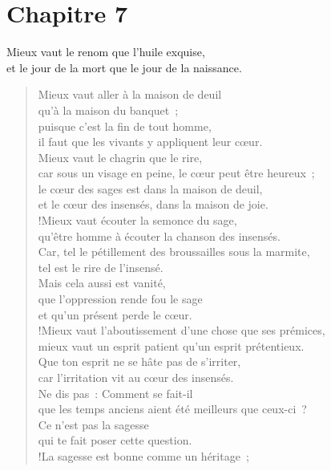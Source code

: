 \documentclass[french,twoside]{book} %
\def\mednobreak{\ifdim\lastskip<\medskipamount
  \removelastskip\nopagebreak\medskip\fi}
\newcommand{\labelblock}[1]{\medbreak{\noindent\color{rubric}\bfseries #1}\par\mednobreak}
\begin{document}
\section[Chapitre 7]{Chapitre 7}\renewcommand{\leftmark}{Chapitre 7}


\labelblock{Relativité des biens}

Mieux vaut le renom que l’huile exquise, \\
et le jour de la mort que le jour de la naissance.\\

\begin{verse}
Mieux vaut aller à la maison de deuil \\
qu’à la maison du banquet ; \\
puisque c’est la fin de tout homme, \\
il faut que les vivants y appliquent leur cœur.\\
Mieux vaut le chagrin que le rire, \\
car sous un visage en peine, le cœur peut être heureux ;\\
le cœur des sages est dans la maison de deuil, \\
et le cœur des insensés, dans la maison de joie.\\!Mieux vaut écouter la semonce du sage, \\
qu’être homme à écouter la chanson des insensés.\\
Car, tel le pétillement des broussailles sous la marmite, \\
tel est le rire de l’insensé. \\
Mais cela aussi est vanité,\\
que l’oppression rende fou le sage \\
et qu’un présent perde le cœur.\\!Mieux vaut l’aboutissement d’une chose que ses prémices, \\
mieux vaut un esprit patient qu’un esprit prétentieux.\\
Que ton esprit ne se hâte pas de s’irriter, \\
car l’irritation vit au cœur des insensés.\\
Ne dis pas : Comment se fait-il \\
que les temps anciens aient été meilleurs que ceux-ci ? \\
Ce n’est pas la sagesse \\
qui te fait poser cette question.\\!La sagesse est bonne comme un héritage ; \\

\end{verse}
\end{document}
